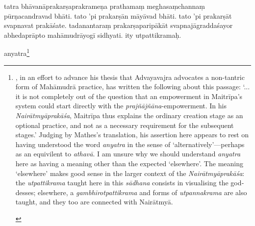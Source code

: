 \documentclass[naipra.tex]{subfiles}
\begin{document}
\begin{sanskrit}


\pstart
tatra bhāvanāprakarṣaprakrameṇa prathamaṃ meghasaṃchannaṃ pūrṇacandravad bhāti.
tato 'pi prakarṣān māyāvad bhāti.
tato 'pi prakarṣāt svapnavat prakāśate.
tadanantaraṃ prakarṣaparipākāt svapnajāgraddaśayor abhedaprāpto mahāmudrāyogī sidhyati.
ity utpattikramaḥ. 
\pend



\pstart
anyatra\footnote{\begin{english}
	\textcites[374]{mathes2014}[132]{mathes2021}, in an effort to advance his thesis that Advayavajra advocates a non-tantric form of Mahāmudrā practice, has written the following about this passage: `... it is not completely out of the question that an empowerment in Maitrīpa's system could start directly with the \emph{prajñājñāna}-empowerment. In his \emph{Nairātmyāprakāśa}, Maitrīpa thus explains the ordinary creation stage as an optional practice, and not as a necessary requirement for the subsequent stages.' 
	Judging by Mathes's translation, his assertion here appears to rest on having understood the word \emph{anyatra} in the sense of `alternatively'—perhaps as an equivilent to \emph{athavā}.
	I am unsure why we should understand \emph{anyatra} here as having a meaning other than the expected `elsewhere'.
	The meaning `elsewhere' makes good sense in the larger context of the \emph{Nairātmyāprakāśa}: the \emph{utpattikrama} taught here in this \emph{sādhana} consists in visualising the goddesses; elsewhere, a \emph{gambhīrotpattikrama} and forms of \emph{utpannakrama} are also taught, and they too are connected with Nairātmyā.


\end{english}}
\end{sanskrit}
\end{document}
